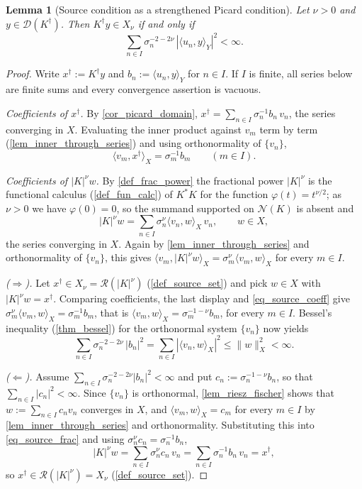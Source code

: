 \documentclass[a4paper]{report}
\theoremstyle{plain}
\newtheorem{lemma}[theorem]{Lemma}
\theoremstyle{definition}
\theoremstyle{remark}
\newcommand{\Ran}{\mathcal{R}}
\newcommand{\Ker}{\mathcal{N}}
\newcommand{\Dom}{\mathcal{D}}
\newcommand{\dg}{^{\dagger}}
\begin{document}
\begin{lemma}[Source condition as a strengthened Picard condition]
  \label{lem_source_picard}
  Let $\nu > 0$ and $y \in \Dom(K\dg)$.  Then $K\dg y \in X_{\nu}$ if and only if
  \[
    \sum_{n \in I} \sigma_n^{-2-2\nu}\,|\langle u_n, y\rangle_Y|^{2} < \infty .
  \]
\end{lemma}

\begin{proof}
  Write $x\dg := K\dg y$ and $b_n := \langle u_n, y\rangle_Y$ for $n \in I$.  If $I$ is
  finite, all series below are finite sums and every convergence assertion is vacuous.

  \emph{Coefficients of $x\dg$.}  By \cref{cor_picard_domain},
  $x\dg = \sum_{n \in I}\sigma_n^{-1}b_n\,v_n$, the series converging in $X$.  Evaluating
  the inner product against $v_m$ term by term (\cref{lem_inner_through_series}) and using
  orthonormality of $\{v_n\}$,
  \begin{equation}\label{eq_source_coeff}
    \langle v_m, x\dg\rangle_X = \sigma_m^{-1}b_m \qquad (m \in I).
  \end{equation}

  \emph{Coefficients of $|K|^{\nu}w$.}  By \cref{def_frac_power} the fractional power
  $|K|^{\nu}$ is the functional calculus (\cref{def_fun_calc}) of $K^{*}K$ for the function
  $\varphi(t) = t^{\nu/2}$; as $\nu > 0$ we have $\varphi(0) = 0$, so the summand
  supported on $\Ker(K)$ is absent and
  \begin{equation}\label{eq_source_frac}
    |K|^{\nu}w = \sum_{n \in I}\sigma_n^{\nu}\langle v_n, w\rangle_X\, v_n ,
      \qquad w \in X ,
  \end{equation}
  the series converging in $X$.  Again by \cref{lem_inner_through_series} and
  orthonormality of $\{v_n\}$, this gives
  $\langle v_m, |K|^{\nu}w\rangle_X = \sigma_m^{\nu}\langle v_m, w\rangle_X$ for every
  $m \in I$.

  \emph{($\Rightarrow$).}  Let $x\dg \in X_{\nu} = \Ran(|K|^{\nu})$
  (\cref{def_source_set}) and pick $w \in X$ with $|K|^{\nu}w = x\dg$.  Comparing
  coefficients, the last display and \eqref{eq_source_coeff} give
  $\sigma_m^{\nu}\langle v_m, w\rangle_X = \sigma_m^{-1}b_m$, that is
  $\langle v_m, w\rangle_X = \sigma_m^{-1-\nu}b_m$, for every $m \in I$.  Bessel's
  inequality (\cref{thm_bessel}) for the orthonormal system $\{v_n\}$ now yields
  \[
    \sum_{n \in I}\sigma_n^{-2-2\nu}\,|b_n|^{2}
      = \sum_{n \in I}|\langle v_n, w\rangle_X|^{2} \le \|w\|_X^{2} < \infty .
  \]

  \emph{($\Leftarrow$).}  Assume $\sum_{n \in I}\sigma_n^{-2-2\nu}|b_n|^{2} < \infty$ and
  put $c_n := \sigma_n^{-1-\nu}b_n$, so that $\sum_{n \in I}|c_n|^{2} < \infty$.  Since
  $\{v_n\}$ is orthonormal, \cref{lem_riesz_fischer} shows that $w := \sum_{n \in I}c_n v_n$
  converges in $X$, and $\langle v_m, w\rangle_X = c_m$ for every $m \in I$ by
  \cref{lem_inner_through_series} and orthonormality.  Substituting this into
  \eqref{eq_source_frac} and using $\sigma_n^{\nu}c_n = \sigma_n^{-1}b_n$,
  \[
    |K|^{\nu}w = \sum_{n \in I}\sigma_n^{\nu}c_n\,v_n
      = \sum_{n \in I}\sigma_n^{-1}b_n\,v_n = x\dg ,
  \]
  so $x\dg \in \Ran(|K|^{\nu}) = X_{\nu}$ (\cref{def_source_set}).
\end{proof}
\end{document}

